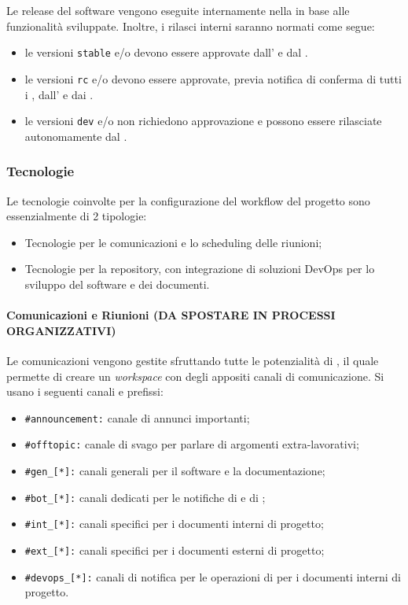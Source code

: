 		Le release del software vengono eseguite internamente nella  in base alle funzionalità sviluppate. Inoltre, i rilasci interni saranno normati come segue:
		\begin{itemize}
			\item le versioni \verb!stable! e/o  devono essere approvate dall' e dal .
			\item le versioni \verb!rc! e/o  devono essere approvate, previa notifica di conferma di tutti i , dall' e dai .
			\item le versioni \verb!dev! e/o  non richiedono approvazione e possono essere rilasciate autonomamente dal .
		\end{itemize}

\subsubsection{Tecnologie}

Le tecnologie coinvolte per la configurazione del workflow del progetto sono essenzialmente di 2 tipologie:
\begin{itemize}
	\item Tecnologie per le comunicazioni e lo scheduling delle riunioni;
	\item Tecnologie per la repository, con integrazione di soluzioni DevOps per lo sviluppo del software e dei documenti.
\end{itemize}

	\paragraph{Comunicazioni e Riunioni (DA SPOSTARE IN PROCESSI ORGANIZZATIVI)}

	Le comunicazioni vengono gestite sfruttando tutte le potenzialità di , il quale permette di creare un \textit{workspace} con degli appositi canali di comunicazione. Si usano i seguenti canali e prefissi:
	\begin{itemize}
		\item \verb!#announcement:! canale di annunci importanti;
		\item \verb!#offtopic:! canale di svago per parlare di argomenti extra-lavorativi;
		\item \verb!#gen_[*]:! canali generali per il software e la documentazione;
		\item \verb!#bot_[*]:! canali dedicati per le notifiche di  e di ;
		\item \verb!#int_[*]:! canali specifici per i documenti interni di progetto;
		\item \verb!#ext_[*]:! canali specifici per i documenti esterni di progetto;
		\item \verb!#devops_[*]:! canali di notifica per le operazioni di  per i documenti interni di progetto.
	\end{itemize}

